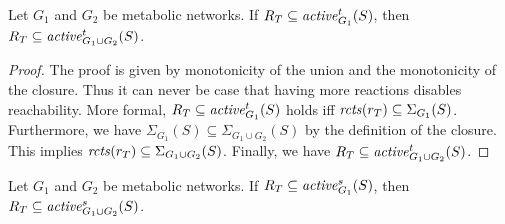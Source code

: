 \begin{theorem}\label{th:topo}
Let $G_1$ and $G_2$ be metabolic networks.
If $R_T\subseteq\mathit{active}^{t}_{G_1}(S)$, then $R_T\subseteq\mathit{active}^{t}_{G_1\cup G_2}(S)$.
\end{theorem}

\begin{proof}
The proof is given by monotonicity of the union and the monotonicity of the closure.
Thus it can never be case that having more reactions disables reachability.
More formal,
$R_T\subseteq\mathit{active}^{t}_{G_1}(S)$ holds iff
$\mathit{rcts}(r_T)\subseteq\Sigma_{G_1}(S)$.
Furthermore, we have
$\Sigma_{G_1}(S)\subseteq \Sigma_{G_1\cup G_2}(S)$
by the definition of the closure.
This implies
$\mathit{rcts}(r_T)\subseteq\Sigma_{G_1\cup G_2}(S)$.
Finally, we have
$R_T\subseteq\mathit{active}^{t}_{G_1\cup G_2}(S)$.
\end{proof}


\begin{theorem}\label{th:flux}
Let $G_1$ and $G_2$ be metabolic networks.
If $R_T\subseteq\mathit{active}^{s}_{G_1}(S)$, then $R_T\subseteq\mathit{active}^{s}_{G_1\cup G_2}(S)$.
\end{theorem}


